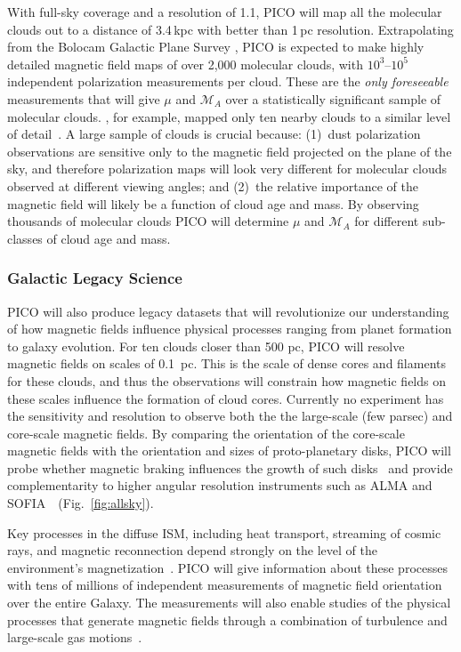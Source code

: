 \documentclass[PICOAPC.tex]{subfiles}
\begin{document}
With full-sky coverage and a resolution of 1.1\arcmin, PICO will map all the molecular clouds out to a distance of 3.4\,kpc with better than 1\,pc resolution.  Extrapolating from the Bolocam Galactic Plane Survey \citep[BGPS,][]{EllsworthBowers2015}, PICO is expected to make highly detailed magnetic field maps of over 2,000 molecular clouds, with $10^3$--$10^5$  independent polarization measurements per cloud. These are the {\it only foreseeable} measurements that will give $\mu$ and $\mathcal{M}_A$ over a statistically significant sample of molecular clouds. \planck , for example, mapped only ten nearby clouds to a similar level of detail~\citep{Planck:XXXV}. A large sample of clouds is crucial because: (1)~dust polarization observations are sensitive only to the magnetic field projected on the plane of the sky, and therefore polarization maps will look very different for molecular clouds observed at different viewing angles; and (2)~the relative importance of the magnetic field will likely be a function of cloud age and mass. By observing thousands of molecular clouds PICO will determine $\mu$ and  $\mathcal{M}_A$ for different sub-classes of cloud age and mass. 

\subsubsection{Galactic Legacy Science}
\label{sec:galactic_legacy}

PICO will also produce legacy datasets that will revolutionize our understanding of how magnetic fields influence physical processes ranging from planet formation to galaxy evolution.  For ten clouds closer than 500 pc, PICO will resolve magnetic fields on scales of 0.1~pc. This is the scale of dense cores and filaments for these clouds, and thus the observations will constrain how magnetic fields on these scales influence the formation of cloud cores.  Currently no experiment has the sensitivity and resolution to observe both the the large-scale (few parsec) and core-scale magnetic fields. By comparing the orientation of the core-scale magnetic fields with the orientation and sizes of proto-planetary disks, PICO will probe whether magnetic braking influences the growth of such disks~\citep{allen_2003,li_2014} and provide complementarity to higher angular resolution instruments such as ALMA and SOFIA~\citep{Bacciotti2018ApJ,Harper2018}~(Fig.~\ref{fig:allsky}).

Key processes in the diffuse ISM, including heat transport, streaming of cosmic rays, and magnetic reconnection depend strongly on the level of the environment's magnetization~\citep{Lazarian:2006,Lazarian:2016,Lazarian_Vishniac:1999}.
PICO will give information about these processes with tens of millions of independent measurements of magnetic field orientation over the entire Galaxy. The measurements will also enable studies of the physical processes that generate magnetic fields through a combination of turbulence and large-scale gas motions~\citep{Xu_2018}.
\end{document}
